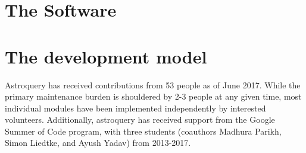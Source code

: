 \section{The Software}

\section{The development model}
Astroquery has received contributions from 53 people as of June 2017.
While the primary maintenance burden is shouldered by 2-3 people at any given time,
most individual modules have been implemented independently by interested volunteers.
Additionally, astroquery has received support from the Google Summer of Code
program, with three students (coauthors Madhura Parikh, Simon Liedtke, and Ayush Yadav)
from 2013-2017.
